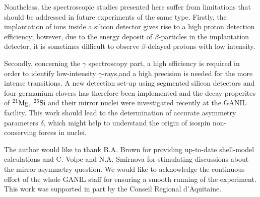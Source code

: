 \documentclass[UTF8]{ctexart}
\begin{document}
Nontheless, the spectroscopic studies presented here suffer from limitations that should be addressed in future experiments of the same type. Firstly, the implantation of ions inside a silicon detector gives rise to a high proton detection efficiency; however, due to the energy deposit of $\beta$-particles in the implantation detector, it is sometimes difficult to observe $\beta$-delayed protons with low intensity.

Secondly, concerning the $\gamma$ spectroscopy part, a high efficiency is required in order to identify low-intensity $\gamma$-rays,and  a high precision is needed for the more intense transitions. A new detection set-up using segmented silicon detectors and four germanium clovers has therefore been implemented and the decay properites of $^{21}\textnormal{Mg}$, $^{25}\textnormal{Si}$ and their mirror nuclei were investigated recently at the GANIL facility. This work should lead to the determination of accurate asymmetry parameters $\delta$, which might help to understand the origin of isospin non-conserving forces in nuclei.

The author would like to thank B.A. Brown for providing up-to-date shell-model calculations and C. Volpe and N.A. Smirnova for stimulating discussions about the mirror asymmetry question. We would like to acknowledge the continuous effort of the whole GANIL staff for ensuring a smooth running of the experiment. This work was supported in part by the Conseil Regional d'Aquitaine.
\end{document}
